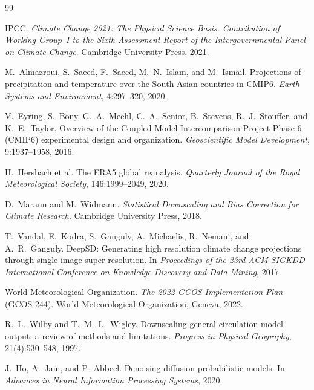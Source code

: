 \documentclass[14pt,a4paper,openany]{extreport}
\begin{document}
\begin{thebibliography}{99}

 IPCC. \emph{Climate Change 2021: The Physical Science Basis. Contribution of Working Group~I to the Sixth Assessment Report of the Intergovernmental Panel on Climate Change}. Cambridge University Press, 2021.

 M.~Almazroui, S.~Saeed, F.~Saeed, M.~N.~Islam, and M.~Ismail. Projections of precipitation and temperature over the South Asian countries in CMIP6. \emph{Earth Systems and Environment}, 4:297--320, 2020.

 V.~Eyring, S.~Bony, G.~A.~Meehl, C.~A.~Senior, B.~Stevens, R.~J.~Stouffer, and K.~E.~Taylor. Overview of the Coupled Model Intercomparison Project Phase 6 (CMIP6) experimental design and organization. \emph{Geoscientific Model Development}, 9:1937--1958, 2016.

 H.~Hersbach et al. The ERA5 global reanalysis. \emph{Quarterly Journal of the Royal Meteorological Society}, 146:1999--2049, 2020.

 D.~Maraun and M.~Widmann. \emph{Statistical Downscaling and Bias Correction for Climate Research}. Cambridge University Press, 2018.

 T.~Vandal, E.~Kodra, S.~Ganguly, A.~Michaelis, R.~Nemani, and A.~R.~Ganguly. DeepSD: Generating high resolution climate change projections through single image super-resolution. In \emph{Proceedings of the 23rd ACM SIGKDD International Conference on Knowledge Discovery and Data Mining}, 2017.

 World Meteorological Organization. \emph{The 2022 GCOS Implementation Plan} (GCOS-244). World Meteorological Organization, Geneva, 2022.

 R.~L.~Wilby and T.~M.~L.~Wigley. Downscaling general circulation model output: a review of methods and limitations. \emph{Progress in Physical Geography}, 21(4):530--548, 1997.

 J.~Ho, A.~Jain, and P.~Abbeel. Denoising diffusion probabilistic models. In \emph{Advances in Neural Information Processing Systems}, 2020.


\end{thebibliography}
\end{document}
